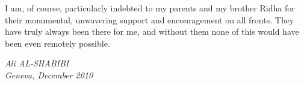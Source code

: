 \medskip
%
I am, of course, particularly indebted to my parents and my brother
Ridha for their monumental, unwavering support and encouragement on all
fronts. They have truly always been there for me, and without them none
of this would have been even remotely possible.
%
\bigskip
\medskip
%

%
\begin{flushright}
  \textit{Ali AL-SHABIBI\\
     Geneva, December 2010}
\end{flushright}


